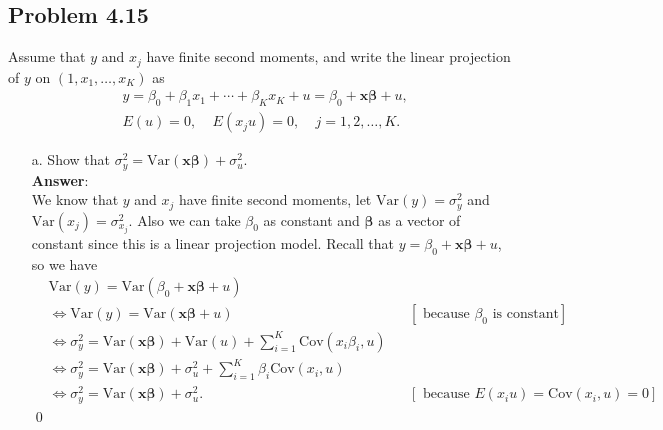 \documentclass[10pt]{article}
\newcommand{\V}{\text{Var}}
\newcommand{\cov}{\text{Cov}}
\begin{document}
\subsection*{Problem 4.15}
Assume that $y$ and $x_j$ have finite second moments, and write the linear projection of $y$ on $(1,x_1,\ldots,x_K)$ as
\begin{align*}
    &y=\beta_0+\beta_1 x_1+\cdots +\beta_K x_K +u=\beta_0 + \textbf{x}\pmb{\beta}+u,\\
    &E(u)=0,\ \ \ \ \ E(x_j u)=0, \ \ \ \ \ j=1,2,\ldots,K.
\end{align*}
\begin{enumerate}
\item[a.] Show that $\sigma_y^2=\V(\textbf{x}\pmb{\beta})+\sigma_u^2.$ 
\\ \textbf{Answer}:\\
We know that $y$ and $x_j$ have finite second moments, let $\V(y)=\sigma_y^2$ and $\V(x_j)=\sigma_{x_j}^2.$ Also we can take $\beta_0$ as constant and $\pmb{\beta}$ as a vector of constant since this is a linear projection model. Recall that $y=\beta_0 + \textbf{x}\pmb{\beta}+u$, so we have 
\begin{align*}
    &\V(y)=\V(\beta_0 + \textbf{x}\pmb{\beta}+u) \\
    &\Leftrightarrow\V(y)=\V(\textbf{x}\pmb{\beta}+u)& &[\text{ because }\beta_0\text{ is constant}]\\
    &\Leftrightarrow\sigma_y^2=\V(\textbf{x}\pmb{\beta})+\V(u)+\sum_{i=1}^K \cov(x_i\beta_i,u)& &\\
    &\Leftrightarrow\sigma_y^2=\V(\textbf{x}\pmb{\beta})+\sigma_u^2+\sum_{i=1}^K \beta_i \cov(x_i,u)& &\\
     &\Leftrightarrow\sigma_y^2=\V(\textbf{x}\pmb{\beta})+\sigma_u^2.& &[\text{ because }E(x_i u)=\cov(x_i,u)=0]
\end{align*}\qed


\end{enumerate}
\end{document}
